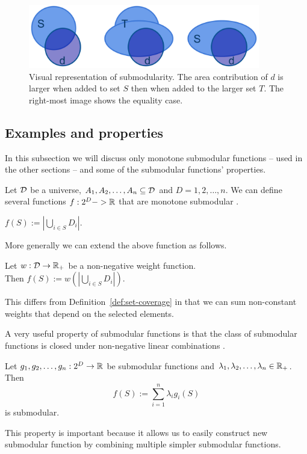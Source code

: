 \begin{figure}
  \centering
  \includegraphics[width=0.9\textwidth,natwidth=1472,natheight=406]{images/submod.png}
  \caption{Visual representation of submodularity. The area contribution of
  \(d\) is larger when added to set \(S\) then when added to the larger set
  \(T\). The right-most image shows the equality case.}
  \label{fig:submodularity}
\end{figure}

\subsection{Examples and properties}

In this subsection we will discuss only monotone submodular functions --
used in the other sections -- and some of the submodular functions'
properties.

Let \(\mathcal{D}\) be a universe, \(A_1, A_2, \ldots, A_n \subseteq \mathcal{D}\) and \(D = {1,
2, \dots, n}\). We can define several functions \(f : 2^D -> \mathbb{R}\) that are
monotone submodular \cite{krause2012submodular}.
\begin{definition}
  \label{def:set-coverage}
  \(f(S) := |\bigcup_{i \in S} D_i|\).
\end{definition}
More generally we can extend the above function as follows.
\begin{definition}
  \label{def:weighted-coverage}
  Let \(w : \mathcal{D} \to \mathbb{R}_+\) be a non-negative weight function. \\
  Then \(f(S) := w(|\bigcup_{i \in S} D_i|)\).
\end{definition}
This differs from Definition~\ref{def:set-coverage} in that we can sum
non-constant weights that depend on the selected elements.

A very useful property of submodular functions is that the class of submodular
functions is closed under non-negative linear combinations
\cite{krause2012submodular}.

\begin{proposition}
\label{prop:linear-combinations}
  Let \(g_1, g_2, \ldots, g_n : 2^D \to \mathbb{R} \) be submodular functions and \(\lambda_1, \lambda_2, \ldots, \lambda_n \in \mathbb{R}_+\). \\
  Then
  \[f(S) := \sum_{i=1}^n \lambda_i g_i(S)\]
  is submodular.
\end{proposition}
This property is important because it allows us to easily construct new
submodular function by combining multiple simpler submodular functions.

